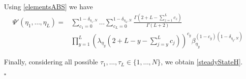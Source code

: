 \documentclass[10pt]{article}
\numberwithin{equation}{section}
\numberwithin{equation}{subsection}
\begin{document}
		Using \eqref{elementsABS} we have 
		\begin{equation}
			\begin{split}
				\Psi{'}(\eta_{1},\ldots,\eta_{L})=&\sum_{c_{1}=0}^{1-\delta_{\eta_{1},N}}\ldots\sum_{c_{L}=0}^{1-\delta_{\eta_{L},N}}\frac{\Gamma(2+L-\sum_{z=1}^{L}c_{z})}{\Gamma(L+2)}
				\\&
				\prod_{y=1}^{L}\left(\lambda_{\eta_{y}}\left(2+L-y-\sum_{j=y}^{L}c_{j}\right)\right)^{c_{y}}\beta_{\eta_{y}}^{(1-c_{y})(1-\delta_{\eta_{y},N})}
			\end{split}
		\end{equation}
	\begin{comment}
		{\color{blue}
			\begin{equation}
				\begin{split}
					&\Psi{'}(\ldots,\tau_{x},\ldots,d_{q_{r}},\ldots)=\sum_{x=1\,:\, x\neq q_{1},\ldots,q_{l}}^{L}\sum_{c_{x}=0}^{1-\delta_{\tau_{x},N}}\sum_{d_{q_{1}}=2}^{N}\ldots\sum_{c_{q_{p}}=0}^{1}\frac{\Gamma(2+L-\sum_{z=1}^{L}c_{z})}{\Gamma(2+L)}
					\\&  
					\prod_{y=1\,:\, y\neq q_{1},\ldots,q_{b}}^{L}\left(\lambda_{\tau_{y}}\left(2+L-y-\sum_{j=y}^{L}c_{j}\right)\right)^{c_{y}}\beta_{\tau_{y}}^{(1-c_{y})(1-\delta_{\tau_{y},N})}
					\\&
					\prod_{t=1}^{b}\lambda_{d_{q_{t}}}\left(2+L-q_{t}-\sum_{j=q_{t}}^{L}c_{j}\right)^{c_{q_{t}}}\beta_{d_{q_{t}}}^{(1-c_{q_{t}})}
				\end{split}
		\end{equation}} 

indeed, in each coordinate $q_{r}$ with $r=1,\ldots b$ the species $N$ is replaced by all other possible species from $1$ to $N-1$.
\end{comment}
 Finally, considering all possible $\tau_{1},\ldots,\tau_{L}\in \{1,\ldots,N\}$, we obtain \eqref{steadyStateH}. 
		\begin{flushright}
			$\square$
		\end{flushright}
\end{document}
